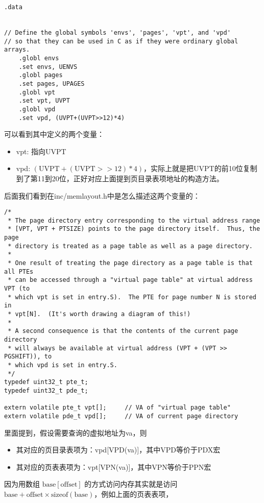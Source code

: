 \documentclass{article}
\begin{document}
\begin{CJK*}{UTF8}{gkai}
\begin{lstlisting}[style=acode, title={\scriptsize \ttfamily \bfseries lib/entry.S}]
.data


// Define the global symbols 'envs', 'pages', 'vpt', and 'vpd'
// so that they can be used in C as if they were ordinary global arrays.
	.globl envs
	.set envs, UENVS
	.globl pages
	.set pages, UPAGES
	.globl vpt
	.set vpt, UVPT
	.globl vpd
	.set vpd, (UVPT+(UVPT>>12)*4)

\end{lstlisting}

可以看到其中定义的两个变量：

\begin{itemize}
\item{vpt: 指向UVPT}
\item{vpd: $(\mathrm{UVPT}+(\mathrm{UVPT}>>12)*4)$}，实际上就是把UVPT的前10位复制到了第11到20位，正好对应上面提到页目录表项地址的构造方法。
\end{itemize}

后面我们看到在inc/memlayout.h中是怎么描述这两个变量的：

\begin{lstlisting}[style=ccode, firstnumber=137, title={\scriptsize \ttfamily \bfseries inc/memlayout.h}]
/*
 * The page directory entry corresponding to the virtual address range
 * [VPT, VPT + PTSIZE) points to the page directory itself.  Thus, the page
 * directory is treated as a page table as well as a page directory.
 *
 * One result of treating the page directory as a page table is that all PTEs
 * can be accessed through a "virtual page table" at virtual address VPT (to
 * which vpt is set in entry.S).  The PTE for page number N is stored in
 * vpt[N].  (It's worth drawing a diagram of this!)
 *
 * A second consequence is that the contents of the current page directory
 * will always be available at virtual address (VPT + (VPT >> PGSHIFT)), to
 * which vpd is set in entry.S.
 */
typedef uint32_t pte_t;
typedef uint32_t pde_t;

extern volatile pte_t vpt[];     // VA of "virtual page table"
extern volatile pde_t vpd[];     // VA of current page directory
\end{lstlisting}

里面提到，假设需要查询的虚拟地址为va，则
\begin{itemize}
\item{其对应的页目录表项为：vpd[VPD(va)]，其中VPD等价于PDX宏}
\item{其对应的页表表项为：vpt[VPN(va)]，其中VPN等价于PPN宏}
\end{itemize}

因为用数组 $\mathrm{base}[\mathrm{offset}]$ 的方式访问内存其实就是访问$\mathrm{base} + \mathrm{offset} \times \mathrm{sizeof(base)}$，例如上面的页表表项，


\end{CJK*}
\end{document}
